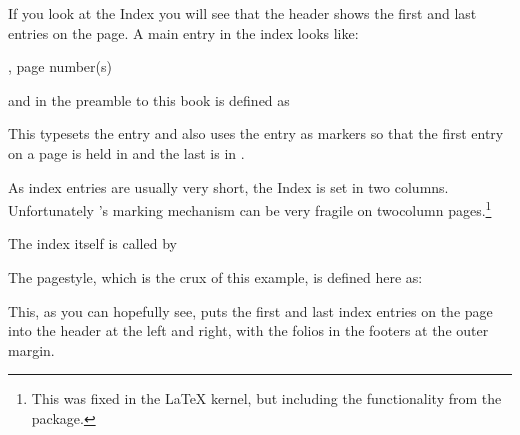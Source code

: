     If you look at the Index you will see that the header 
shows the first and last entries on the page.
A main entry in the index looks like:
\begin{lcode}
\item {}, page number(s)
\end{lcode}
and in the preamble to this book \cmd{\idxmark} is defined as
\begin{lcode}
\newcommand{\idxmark}[1]{#1\markboth{#1}{#1}}
\end{lcode}
This typesets the entry and also uses the entry as markers so that
the first entry on a page is held in \cmd{\rightmark} and the last
is in \cmd{\leftmark}.

    As index entries are usually very short, the 
Index is set in two columns. 
Unfortunately \ltx's marking mechanism can be very
fragile on twocolumn pages.\footnote{This was
  fixed in the \LaTeX{} kernel, but including the functionality from
  the  package.}

    The index itself is called by
\begin{lcode}
\clearpage
\pagestyle{index}
\renewcommand{\preindexhook}{%
The first page number is usually, but not always, 
the primary reference to
the indexed topic.\vskip\onelineskip}
\printindex
\end{lcode}


    The  pagestyle, which is the crux of
this example, is defined here as:
\begin{lcode}
\end{lcode}
This, as you can hopefully see, puts the first and last index 
entries on the page into the header at the left and right, 
with the folios in the footers at the 
outer margin.

